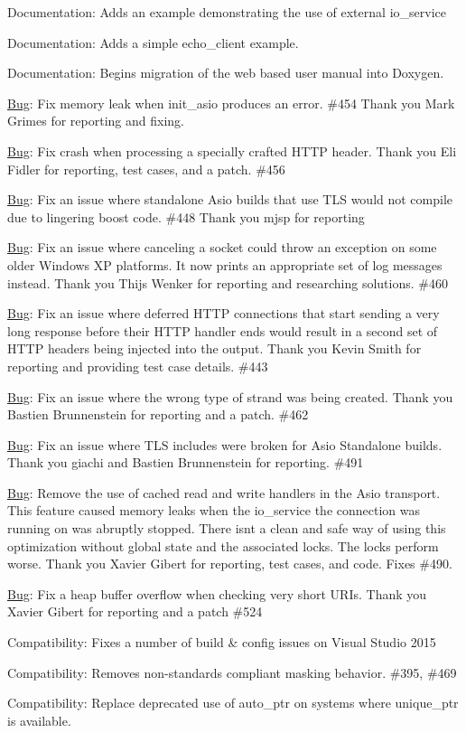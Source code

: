 \begin{DoxyItemize}
\item Documentation\+: Adds an example demonstrating the use of external {\ttfamily io\+\_\+service}
\item Documentation\+: Adds a simple echo\+\_\+client example.
\item Documentation\+: Begins migration of the web based user manual into Doxygen.
\item \mbox{\hyperlink{struct_bug}{Bug}}\+: Fix memory leak when init\+\_\+asio produces an error. \#454 Thank you Mark Grimes for reporting and fixing.
\item \mbox{\hyperlink{struct_bug}{Bug}}\+: Fix crash when processing a specially crafted H\+T\+TP header. Thank you Eli Fidler for reporting, test cases, and a patch. \#456
\item \mbox{\hyperlink{struct_bug}{Bug}}\+: Fix an issue where standalone Asio builds that use T\+LS would not compile due to lingering boost code. \#448 Thank you mjsp for reporting
\item \mbox{\hyperlink{struct_bug}{Bug}}\+: Fix an issue where canceling a socket could throw an exception on some older Windows XP platforms. It now prints an appropriate set of log messages instead. Thank you Thijs Wenker for reporting and researching solutions. \#460
\item \mbox{\hyperlink{struct_bug}{Bug}}\+: Fix an issue where deferred H\+T\+TP connections that start sending a very long response before their H\+T\+TP handler ends would result in a second set of H\+T\+TP headers being injected into the output. Thank you Kevin Smith for reporting and providing test case details. \#443
\item \mbox{\hyperlink{struct_bug}{Bug}}\+: Fix an issue where the wrong type of strand was being created. Thank you Bastien Brunnenstein for reporting and a patch. \#462
\item \mbox{\hyperlink{struct_bug}{Bug}}\+: Fix an issue where T\+LS includes were broken for Asio Standalone builds. Thank you giachi and Bastien Brunnenstein for reporting. \#491
\item \mbox{\hyperlink{struct_bug}{Bug}}\+: Remove the use of cached read and write handlers in the Asio transport. This feature caused memory leaks when the io\+\_\+service the connection was running on was abruptly stopped. There isn\textquotesingle{}t a clean and safe way of using this optimization without global state and the associated locks. The locks perform worse. Thank you Xavier Gibert for reporting, test cases, and code. Fixes \#490.
\item \mbox{\hyperlink{struct_bug}{Bug}}\+: Fix a heap buffer overflow when checking very short U\+R\+Is. Thank you Xavier Gibert for reporting and a patch \#524
\item Compatibility\+: Fixes a number of build \& config issues on Visual Studio 2015
\item Compatibility\+: Removes non-\/standards compliant masking behavior. \#395, \#469
\item Compatibility\+: Replace deprecated use of auto\+\_\+ptr on systems where unique\+\_\+ptr is available.
\end{DoxyItemize}

